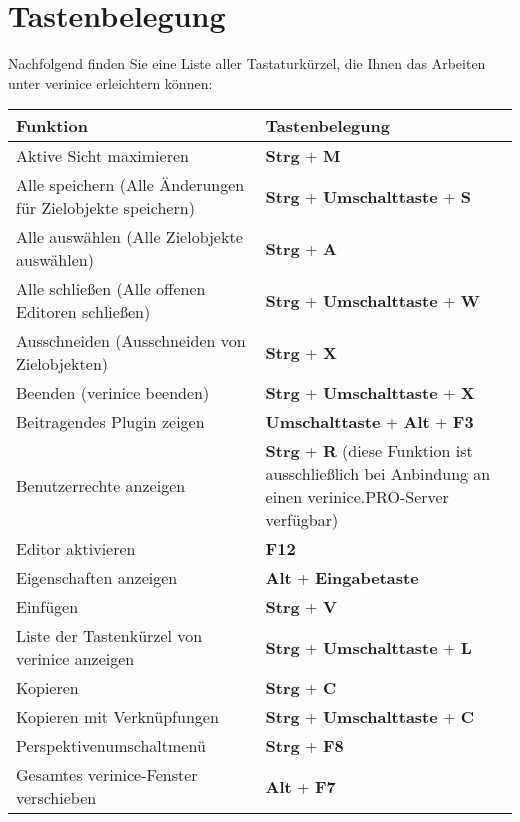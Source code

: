 \documentclass[a4paper,10pt]{book}
\begin{document}
\section{Tastenbelegung}
Nachfolgend finden Sie eine Liste aller Tastaturkürzel, die Ihnen das Arbeiten unter verinice erleichtern können:
\\
\begin{longtable}{| p{} | p{} |}
\hline
\textbf{Funktion} & \textbf{Tastenbelegung} \\[10pt]
\hline\hline
Aktive Sicht maximieren & \textbf{Strg} + \textbf{M} \\[10pt] \hline
Alle speichern (Alle Änderungen für Zielobjekte speichern) & \textbf{Strg} + \textbf{Umschalttaste} + \textbf{S} \\[10pt] \hline
Alle auswählen (Alle Zielobjekte auswählen) & \textbf{Strg} + \textbf{A} \\[10pt] \hline
Alle schließen (Alle offenen Editoren schließen) & \textbf{Strg} + \textbf{Umschalttaste} + \textbf{W} \\[10pt] \hline
Ausschneiden (Ausschneiden von Zielobjekten) & \textbf{Strg} + \textbf{X} \\[10pt] \hline
Beenden (verinice beenden) & \textbf{Strg} + \textbf{Umschalttaste} + \textbf{X} \\[10pt] \hline
Beitragendes Plugin zeigen & \textbf{Umschalttaste} + \textbf{Alt} + \textbf{F3} \\[10pt] \hline
Benutzerrechte anzeigen & \textbf{Strg} + \textbf{R} (diese Funktion ist ausschließlich bei Anbindung an einen verinice.\textsc{PRO}-Server verfügbar) \\[10pt] \hline
Editor aktivieren & \textbf{F12} \\[10pt] \hline
Eigenschaften anzeigen & \textbf{Alt} + \textbf{Eingabetaste} \\[10pt] \hline
Einfügen & \textbf{Strg} + \textbf{V} \\[10pt] \hline
Liste der Tastenkürzel von verinice anzeigen & \textbf{Strg} + \textbf{Umschalttaste} + \textbf{L} \\[10pt] \hline
Kopieren & \textbf{Strg} + \textbf{C} \\[10pt] \hline
Kopieren mit Verknüpfungen & \textbf{Strg} + \textbf{Umschalttaste} + \textbf{C} \\[10pt] \hline
Perspektivenumschaltmenü & \textbf{Strg} + \textbf{F8} \\[10pt] \hline
Gesamtes verinice-Fenster verschieben & \textbf{Alt} + \textbf{F7} \\[10pt] \hline

\end{longtable}
\end{document}
